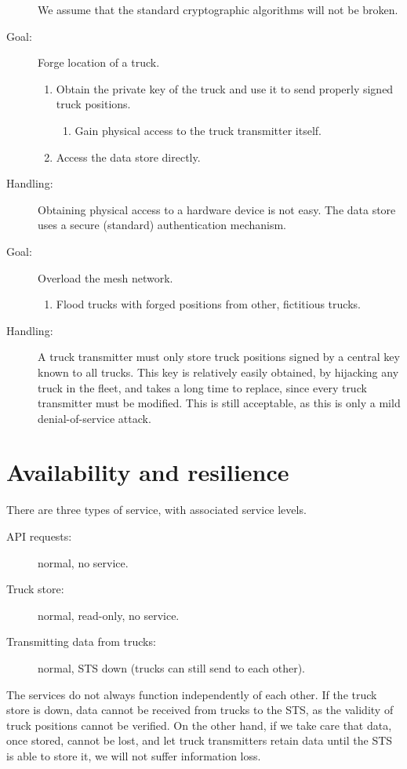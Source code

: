 \documentclass[a4paper,11pt]{report}
\begin{document}
\begin{description}
  We assume that the standard cryptographic algorithms will not be broken.
\item[Goal: ] Forge location of a truck.
  \begin{enumerate}
  \item Obtain the private key of the truck and use it to send
    properly signed truck positions.
    \begin{enumerate}
      \item Gain physical access to the truck transmitter itself.
    \end{enumerate}
  \item Access the data store directly.
  \end{enumerate}
\item[Handling: ] Obtaining physical access to a hardware device is
  not easy.  The data store uses a secure (standard) authentication
  mechanism.
\item[Goal: ] Overload the mesh network.
  \begin{enumerate}
  \item Flood trucks with forged positions from other, fictitious
    trucks.
  \end{enumerate}
\item[Handling: ] A truck transmitter must only store truck positions
  signed by a central key known to all trucks.  This key is relatively
  easily obtained, by hijacking any truck in the fleet, and takes a
  long time to replace, since every truck transmitter must be
  modified.  This is still acceptable, as this is only a mild
  denial-of-service attack.
\end{description}

\section{Availability and resilience}
\label{sec:avail-resil}

There are three types of service, with associated service levels.

\begin{description}
\item[API requests: ] normal, no service.
\item[Truck store: ] normal, read-only, no service.
\item[Transmitting data from trucks: ] normal, STS down (trucks can
  still send to each other).
\end{description}

The services do not always function independently of each other.  If
the truck store is down, data cannot be received from trucks to the
STS, as the validity of truck positions cannot be verified.  On the
other hand, if we take care that data, once stored, cannot be lost,
and let truck transmitters retain data until the STS is able to store
it, we will not suffer information loss.
\end{document}
